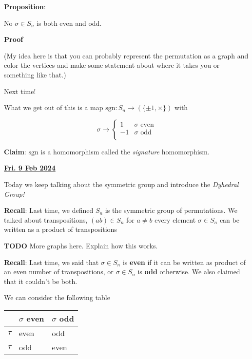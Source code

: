\documentclass[12pt]{article}
\renewcommand{\date}[1]{\newpage \underline{\bf #1}}
\def\sgn{\text{sgn}}
\def\sgn{\text{sgn}}
\newcommand{\TODO}{\color{red}\textbf{TODO}\color{black}}
\begin{document}

{\bf Proposition}:

No $\sigma \in S_n$ is both even and odd.

{\bf Proof}

(My idea here is that you can probably represent the permutation as a graph and
color the vertices and make some statement about where it takes you or something
like that.)

Next time!

What we get out of this is a map $\sgn: S_n \to (\{\pm 1, \times\})$ with

\[
  \sigma \to \begin{cases}
    1 & \sigma \text{ even} \\
    -1 & \sigma \text{ odd} \\
  \end{cases}
\]

{\bf Claim}: $\sgn$ is a homomorphism called the {\it signature} homomorphism.

\date{Fri. 9 Feb 2024}

Today we keep talking about the symmetric group and introduce the {\it Dyhedral
Group!}

{\bf Recall}: Last time, we defined $S_n$ is the symmetric group of
permutations. We talked about transpositions, $(ab) \in S_n$ for $a \ne b$ every
element $\sigma \in S_n$ can be written as a product of transpositions


\TODO{} More graphs here. Explain how this works.

{\bf Recall}: Last time, we said that $\sigma \in S_n$ is {\bf even} if it can
be written as product of an even number of transpositions, or $\sigma \in S_n$
is {\bf odd} otherwise. We also claimed that it couldn't be both.

We can consider the following table

  \begin{center}
    \begin{tabular}[c]{l|l|l}
      & $\sigma$ even & $\sigma$ odd \\
      \hline
      $\tau$ & even & odd \\
      $\tau$ & odd & even \\

      \hline
    \end{tabular}
  \end{center}
\end{document}
